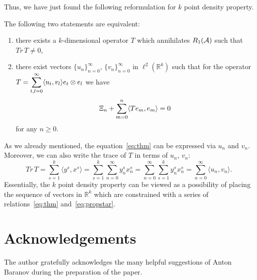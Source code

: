 \documentclass[12pt]{amsart}
\theoremstyle{case}
\begin{document}
  Thus, we have just found the following reformulation for $k$ point density property.
  \begin{prop}
    \label{prop:kreformulation}
    The following two statements are equivalent:
    \begin{enumerate}
      \item there exists a $k$-dimensional operator $T$ which annihilates $R_1(\cal{A})$
        such that $Tr\, T \neq 0$,
      \item there exist vectors $\{u_n\}_{n=0}^\infty$, $\{v_n\}_{n=0}^\infty$ in $\ell^2(\mathbb{R}^k)$ such that
        for the operator $T = \displaystyle\sum_{t,l=0}^\infty \inner{u_t}{v_l} e_t \otimes e_l$ we have
        \begin{equation}
          \label{eq:thm}
          \Xi_n + \sum_{m=0}^n \inner{Te_m}{e_m} = 0
        \end{equation}
          for any $n \geq 0$.
    \end{enumerate}
  \end{prop}
  As we already mentioned, the equation~\eqref{eq:thm} can be expressed via $u_n$ and $v_n$.
  Moreover, we can also write the trace of $T$ in terms of $u_n$, $v_n$:
    \begin{equation}
      \label{eq:propstar}
        Tr\,T = \sum_{s=1}^k \langle y^s, x^s \rangle = \sum_{s=1}^k \sum_{n=0}^\infty y^s_n x^s_n
              = \sum_{n=0}^\infty \sum_{s=1}^k y^s_n x^s_n = \sum_{n=0}^\infty \langle u_n, v_n \rangle.
    \end{equation}
  Essentially, the $k$ point density property can be viewed as a
    possibility of placing the sequence of vectors in $\mathbb{R}^k$ which are constrained with
    a series of relations~\eqref{eq:thm} and~\eqref{eq:propstar}.


\bigskip

\section{Acknowledgements}
  The author gratefully acknowledges the many helpful suggestions of Anton Baranov during the preparation of the paper.


\end{document}

